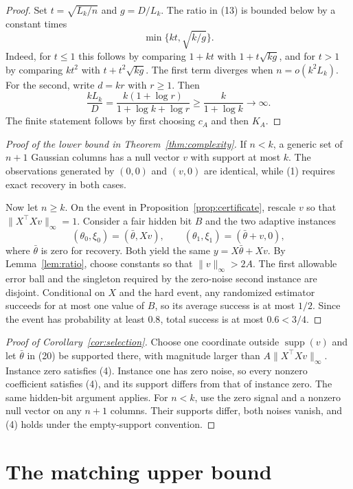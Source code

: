 \documentclass[twoside]{article}
\newcommand{\supp}{\operatorname{supp}}
\begin{document}
\begin{proof}
Set $t=\sqrt{L_k/n}$ and $g=D/L_k$. The ratio in (13) is bounded below by a constant times \[ \min\{kt,\sqrt{k/g}\}. \tag{19} \] Indeed, for $t\leq1$ this follows by comparing $1+kt$ with $1+t\sqrt{kg}$, and for $t>1$ by comparing $kt^2$ with $t+t^2\sqrt{kg}$. The first term diverges when $n=o(k^2L_k)$. For the second, write $d=kr$ with $r\geq1$. Then \[ \frac{kL_k}{D} =\frac{k(1+\log r)}{1+\log k+\log r} \geq\frac{k}{1+\log k}\longrightarrow\infty. \] The finite statement follows by first choosing $c_A$ and then $K_A$.
\end{proof}

\begin{proof}[Proof of the lower bound in Theorem~\ref{thm:complexity}]
If $n<k$, a generic set of $n+1$ Gaussian columns has a null vector $v$ with support at most $k$. The observations generated by $(0,0)$ and $(v,0)$ are identical, while (1) requires exact recovery in both cases.

Now let $n\geq k$. On the event in Proposition~\ref{prop:certificate}, rescale $v$ so that $\|X^\top Xv\|_\infty=1$. Consider a fair hidden bit $B$ and the two adaptive instances \[ (\theta_0,\xi_0)=(\bar\theta,Xv), \qquad (\theta_1,\xi_1)=(\bar\theta+v,0), \tag{20} \] where $\bar\theta$ is zero for recovery. Both yield the same $y=X\bar\theta+Xv$. By Lemma~\ref{lem:ratio}, choose constants so that $\|v\|_\infty>2A$. The first allowable error ball and the singleton required by the zero-noise second instance are disjoint. Conditional on $X$ and the hard event, any randomized estimator succeeds for at most one value of $B$, so its average success is at most $1/2$. Since the event has probability at least $0.8$, total success is at most $0.6<3/4$.
\end{proof}

\begin{proof}[Proof of Corollary~\ref{cor:selection}]
Choose one coordinate outside $\supp(v)$ and let $\bar\theta$ in (20) be supported there, with magnitude larger than $A\|X^\top Xv\|_\infty$. Instance zero satisfies (4). Instance one has zero noise, so every nonzero coefficient satisfies (4), and its support differs from that of instance zero. The same hidden-bit argument applies. For $n<k$, use the zero signal and a nonzero null vector on any $n+1$ columns. Their supports differ, both noises vanish, and (4) holds under the empty-support convention.
\end{proof}

\section{The matching upper bound}
\label{sec:upper}
\end{document}
